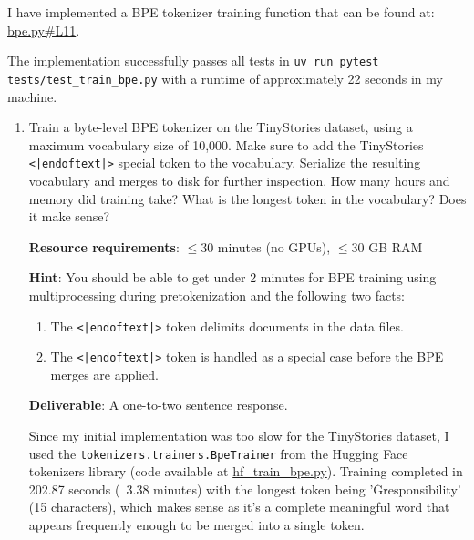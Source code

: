 \begin{answer}
I have implemented a BPE tokenizer training function that can be found at: \href{https://github.com/donglinkang2021/cs336-assignment1-basics/blob/main/cs336_basics/bpe.py#L11}{bpe.py\#L11}.

The implementation successfully passes all tests in \lstinline{uv run pytest tests/test_train_bpe.py} with a runtime of approximately 22 seconds in my machine.
\end{answer}


\begin{enumerate}[label=(\alph*)]
    \item Train a byte-level BPE tokenizer on the TinyStories dataset, using a maximum vocabulary size of 10,000. Make sure to add the TinyStories \lstinline{<|endoftext|>} special token to the vocabulary. Serialize the resulting vocabulary and merges to disk for further inspection. How many hours and memory did training take? What is the longest token in the vocabulary? Does it make sense?
    
    \textbf{Resource requirements}: $\le$30 minutes (no GPUs), $\le$30 GB RAM
    
    \textbf{Hint}: You should be able to get under 2 minutes for BPE training using multiprocessing during pretokenization and the following two facts:
    \begin{enumerate}[label=(\alph*)]
        \item The \lstinline{<|endoftext|>} token delimits documents in the data files.
        \item The \lstinline{<|endoftext|>} token is handled as a special case before the BPE merges are applied.
    \end{enumerate}
    
    \textbf{Deliverable}: A one-to-two sentence response.
    
    \begin{answer}
    Since my initial implementation was too slow for the TinyStories dataset, I used the \lstinline{tokenizers.trainers.BpeTrainer} from the Hugging Face tokenizers library (code available at \href{https://github.com/donglinkang2021/cs336-assignment1-basics/blob/main/data_utils/hf_train_bpe.py}{hf\_train\_bpe.py}). Training completed in 202.87 seconds (~3.38 minutes) with the longest token being 'Ġresponsibility' (15 characters), which makes sense as it's a complete meaningful word that appears frequently enough to be merged into a single token.
    \end{answer}
    

\end{enumerate}

